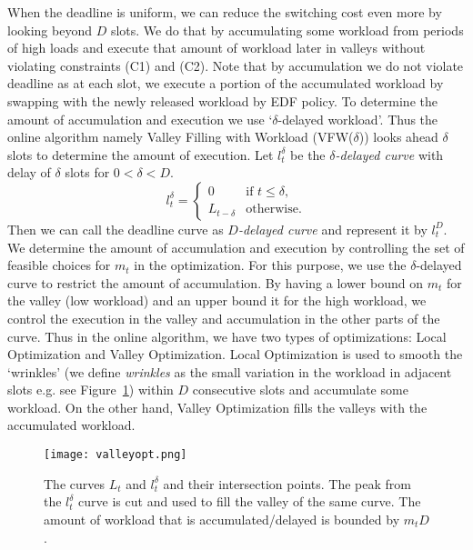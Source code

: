 \documentclass[10pt,conference,compsocconf,letterpaper]{IEEEtran}
\begin{document}
When the deadline is uniform, we can reduce the switching cost even more by looking beyond $D$ slots. We do that by accumulating some workload from periods of high loads and execute that amount of workload later in valleys without violating constraints (C1) and (C2). Note that by accumulation we do not violate deadline as at each slot, we execute a portion of the accumulated workload by swapping with the newly released workload by EDF policy. To determine the amount of accumulation and execution we use `$\delta$-delayed workload'. Thus the online algorithm namely Valley Filling with Workload (VFW($\delta$)) looks ahead $\delta$ slots to determine the amount of execution. Let $l^{\delta}_t$ be the {\it $\delta$-delayed curve} with delay of $\delta$ slots for $0<\delta <D$.
\begin{equation*}
l^\delta_t =
\begin{cases}
0 & \text{if } t \le \delta,\\
L_{t-\delta} & \text{otherwise.}
\end{cases}
\end{equation*}
Then we can call the deadline curve as {\it $D$-delayed curve} and represent it by $l^D_t$. We determine the amount of accumulation and execution by controlling the set of feasible choices for $m_t$ in the optimization. For this purpose, we use the $\delta$-delayed curve to restrict the amount of accumulation. By having a lower bound on $m_t$ for the valley (low workload) and an upper bound it for the high workload, we control the execution in the valley and accumulation in the other parts of the curve. Thus in the online algorithm, we have two types of optimizations: Local Optimization and Valley Optimization. Local Optimization is used to smooth the `wrinkles' (we define {\it wrinkles} as the small variation in the workload in adjacent slots e.g. see Figure~\ref{fig:valleyopt}) within $D$ consecutive slots and accumulate some workload. On the other hand, Valley Optimization fills the valleys with the accumulated workload.

\begin{figure}[!t]
\begin{center}
\texttt{[image: valleyopt.png]}
\caption{The curves $L_t$ and $l^\delta_t$ and their intersection points. The peak from the $l^\delta_t$ curve is cut and used to fill the valley of the same curve. The amount of workload that is accumulated/delayed is bounded by $m_tD$.}
\label{fig:valleyopt}
\end{center}
\end{figure}
\end{document}

